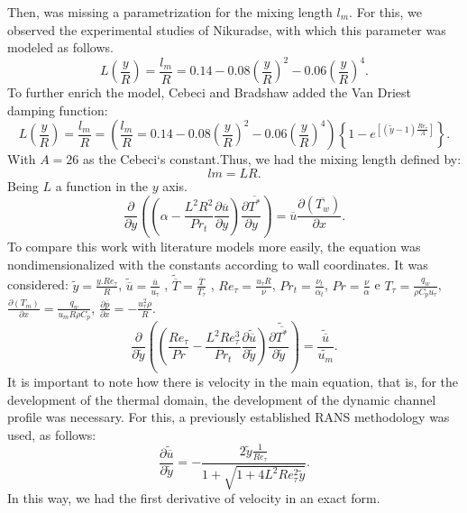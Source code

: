 \documentclass[10pt]{article} %
\begin{document}
Then, was missing a parametrization for the mixing length $ l_m $. For this, we observed the experimental studies of Nikuradse, with which this parameter was modeled as follows.
\begin{equation}
L\left(\frac{y}{R}\right) = \frac{l_m}{R} = 0.14 - 0.08 \left(\frac{y}{R}\right)^2 - 0.06\left(\frac{y}{R}\right)^4.
\end{equation}
To further enrich the model, Cebeci and Bradshaw added the Van Driest damping function:
\begin{equation}
L\left(\frac{y}{R}\right)  = \frac{l_m}{R} = \left(\frac{l_m}{R} = 0.14 - 0.08 \left(\frac{y}{R}\right)^2 - 0.06\left(\frac{y}{R}\right)^4\right)\left\{  1 - e^{[(\tilde{y} - 1) \frac{Re_\tau}{A}]}\right\}.
\end{equation}
With $A = 26$ as the Cebeci`s constant.Thus, we had the mixing length defined by:
\begin{equation}
lm = L R.
\end{equation}
Being $ L $ a function in the $ y $ axis.
\begin{equation}
{\frac{\partial{}}{\partial{y}}} \left( \left( \alpha   
- \frac{{L}^2 R ^2}{Pr_t}\frac{\partial \overline{u}}{\partial y} \right) \frac{\partial \overline{T^\ast}}{\partial y} \right)
= 
\overline{u}\frac{\partial{}\left(\overline{T_w}\right)  }{\partial{x}}.
\end{equation}
 To compare this work with literature models more easily, the equation was nondimensionalized with the constants according to wall coordinates. It was considered: $ \tilde{y} = \frac{y . Re_\tau}{R} $, $ \tilde{\overline{u}} = \frac{\overline{u}}{u_\tau} $ , $ \tilde{\overline{T}} = \frac{\overline{T}}{T_\tau} $ , $Re_\tau = \frac{u_\tau R}{\nu}$, $Pr_t = \frac{\nu_t}{\alpha_t}$, $Pr = \frac{\nu}{\alpha}$ e $T_\tau = \frac{q_w}{\rho C_p u_\tau}$, $\frac{\partial{\left(T_m\right)}}{\partial{x}} = \frac{q_w}{u_m  R \rho  C_p } $, $\frac{\partial \overline{p}}{\partial x} = - \frac{u_\tau^2 \rho}{R} $.
\\
\begin{equation}
{\frac{\partial{}}{\partial{\tilde{y}}}} \left( \left( \frac{Re_\tau}{Pr}   
- \frac{{L}^2 Re_\tau ^3}{Pr_t}\frac{\partial \tilde{\overline{u}}}{\partial \tilde{y}} \right) \frac{\partial \tilde{\overline{T^\ast}}}{\partial \tilde{y}} \right)
= 
\frac{\tilde{\overline{u}}}{\tilde{u_m}}.
\end{equation}
It is important to note how there is velocity in the main equation, that is, for the development of the thermal domain, the development of the dynamic channel profile was necessary. For this, a previously established RANS methodology was used, as follows:
\begin{equation}
\frac{\partial \tilde{\overline{u}}}{\partial \tilde{y}} = - \frac{2 \tilde{y} \frac{1}{Re_\tau} }{ 1 + \sqrt{ 1 + 4 L ^2 Re_\tau ^2 \tilde{y}}}.
\end{equation}		
In this way, we had the first derivative of velocity in an exact form.
\end{document}
